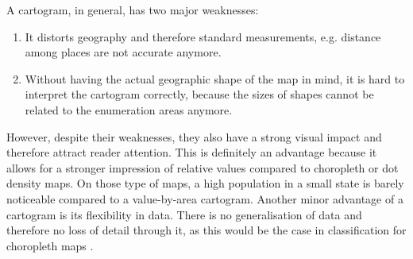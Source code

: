 A cartogram, in general, has two major weaknesses:
\begin{enumerate}
\item It distorts geography and therefore standard measurements, e.g. distance among places are not accurate anymore.
\item Without having the actual geographic shape of the map in mind, it is hard to interpret the cartogram correctly, because the sizes of shapes cannot be related to the enumeration areas anymore.
\end{enumerate}

However, despite their weaknesses, they also have a strong visual impact and therefore attract reader attention. This is definitely an advantage because it allows for a stronger impression of relative values compared to choropleth or dot density maps. On those type of maps, a high population in a small state is barely noticeable compared to a value-by-area cartogram.
Another minor advantage of a cartogram is its flexibility in data. There is no generalisation of data and therefore no loss of detail through it, as this would be the case in classification for choropleth maps .

